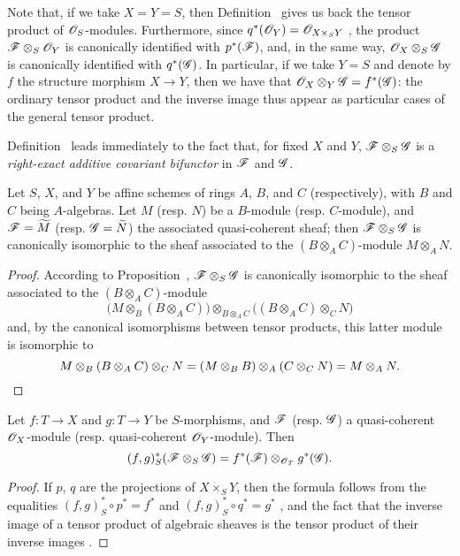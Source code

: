 Note that, if we take $X=Y=S$, then Definition~ gives us back the tensor
product of $\mathscr{O}_S$-modules. Furthermore, since $q^*(\mathscr{O}_Y)=\mathscr{O}_{X\times_S Y}$
, the product $\mathscr{F}\otimes_S\mathscr{O}_Y$ is canonically
identified with $p^*(\mathscr{F})$, and, in the same way,
$\mathscr{O}_X\otimes_S\mathscr{G}$ is canonically identified with $q^*(\mathscr{G})$. In
particular, if we take $Y=S$ and denote by $f$ the structure morphism $X\to Y$,
then we have that $\mathscr{O}_X\otimes_Y\mathscr{G}=f^*(\mathscr{G})$: the ordinary tensor
product and the inverse image thus appear as particular cases of the general
tensor product.

Definition~ leads immediately to the fact that, for fixed $X$ and
$Y$, $\mathscr{F}\otimes_S\mathscr{G}$ is a \emph{right-exact additive covariant bifunctor} in $\mathscr{F}$ and $\mathscr{G}$.

\begin{prop}[9.1.3]
\label{1.9.1.3}
Let $S$, $X$, and $Y$ be affine schemes of rings
$A$, $B$, and $C$ (respectively), with $B$ and $C$ being $A$-algebras. Let $M$
(resp. $N$) be a $B$-module (resp. $C$-module), and
$\mathscr{F}={\widetilde{M}}$ (resp. $\mathscr{G}={\widetilde{N}}$) the
associated quasi-coherent sheaf; then $\mathscr{F}\otimes_S\mathscr{G}$ is
canonically isomorphic to the sheaf associated to the $(B\otimes_A C)$-module
$M\otimes_A N$.
\end{prop}

\begin{proof}
\label{proof-1.9.1.3}
According to Proposition~, $\mathscr{F}\otimes_S\mathscr{G}$
is canonically isomorphic to the sheaf associated to the $(B\otimes_A C)$-module
\[
  \big(M\otimes_B(B\otimes_A C)\big)\otimes_{B\otimes_A C}\big((B\otimes_A C)\otimes_C N\big)
\]
and, by the canonical isomorphisms between tensor
products, this latter module is isomorphic to
\[
  M\otimes_B(B\otimes_A C)\otimes_C N=(M\otimes_B B)\otimes_A(C\otimes_C N)=M\otimes_A N.\qedhere
\]
\end{proof}

\begin{prop}[9.1.4]
\label{1.9.1.4}
Let $f:T\to X$ and $g:T\to Y$ be $S$-morphisms, and $\mathscr{F}$ (resp. $\mathscr{G}$) a quasi-coherent
$\mathscr{O}_X$-module (resp. quasi-coherent $\mathscr{O}_Y$-module). Then
\[
  (f,g)^*_S(\mathscr{F}\otimes_S\mathscr{G})=f^*(\mathscr{F})\otimes_{\mathscr{O}_T}g^*(\mathscr{G}).
\]
\end{prop}

\begin{proof}
\label{proof-1.9.14}
If $p$, $q$ are the projections of $X\times_S Y$, then the formula follows
from the equalities $(f,g)^*_S\circ p^*=f^*$ and
$(f,g)^*_S\circ q^*=g^*$ , and the fact that the inverse
image of a tensor product of algebraic sheaves is the tensor product of their inverse
images .
\end{proof}

